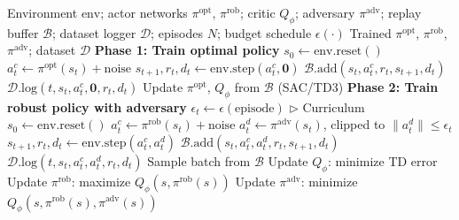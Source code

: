 \documentclass[conference]{IEEEtran}
\newcommand{\cD}{\mathcal{D}}
\newcommand{\piopt}{\pi^{\text{opt}}}
\newcommand{\pirob}{\pi^{\text{rob}}}
\newcommand{\piadv}{\pi^{\text{adv}}}
\begin{document}
\begin{algorithm}[t]
\caption{Off-Policy Adversarial Training Loop}
\label{alg:adversarial_training}
\begin{algorithmic}[1]
\renewcommand{\algorithmicrequire}{\textbf{Input:}}
\renewcommand{\algorithmicensure}{\textbf{Output:}}
\REQUIRE Environment $\text{env}$; actor networks $\piopt$, $\pirob$;
  critic $Q_\phi$; adversary $\piadv$; replay buffer $\mathcal{B}$;
  dataset logger $\cD$; episodes $N$; budget schedule $\epsilon(\cdot)$
\ENSURE Trained $\piopt$, $\pirob$, $\piadv$; dataset $\cD$
\STATE \textbf{Phase 1: Train optimal policy}
  \STATE $s_0 \leftarrow \text{env.reset}()$
    \STATE $a_t^c \leftarrow \piopt(s_t) + \text{noise}$
    \STATE $s_{t+1}, r_t, d_t \leftarrow \text{env.step}(a_t^c, \boldsymbol{0})$
    \STATE $\mathcal{B}.\text{add}(s_t, a_t^c, r_t, s_{t+1}, d_t)$
    \STATE $\cD.\text{log}(t, s_t, a_t^c, \boldsymbol{0}, r_t, d_t)$
    \STATE Update $\piopt$, $Q_\phi$ from $\mathcal{B}$ (SAC/TD3)
  \ENDFOR
\ENDFOR
\STATE \textbf{Phase 2: Train robust policy with adversary}
  \STATE $\epsilon_t \leftarrow \epsilon(\text{episode})$ \hfill $\triangleright$ Curriculum
  \STATE $s_0 \leftarrow \text{env.reset}()$
    \STATE $a_t^c \leftarrow \pirob(s_t) + \text{noise}$
    \STATE $a_t^d \leftarrow \piadv(s_t)$, clipped to $\|a_t^d\| \leq \epsilon_t$
    \STATE $s_{t+1}, r_t, d_t \leftarrow \text{env.step}(a_t^c, a_t^d)$
    \STATE $\mathcal{B}.\text{add}(s_t, a_t^c, a_t^d, r_t, s_{t+1}, d_t)$
    \STATE $\cD.\text{log}(t, s_t, a_t^c, a_t^d, r_t, d_t)$
    \STATE Sample batch from $\mathcal{B}$
    \STATE Update $Q_\phi$: minimize TD error
    \STATE Update $\pirob$: maximize $Q_\phi(s, \pirob(s))$
    \STATE Update $\piadv$: minimize $Q_\phi(s, \pirob(s), \piadv(s))$
  \ENDFOR
\ENDFOR
\end{algorithmic}
\end{algorithm}
\end{document}
